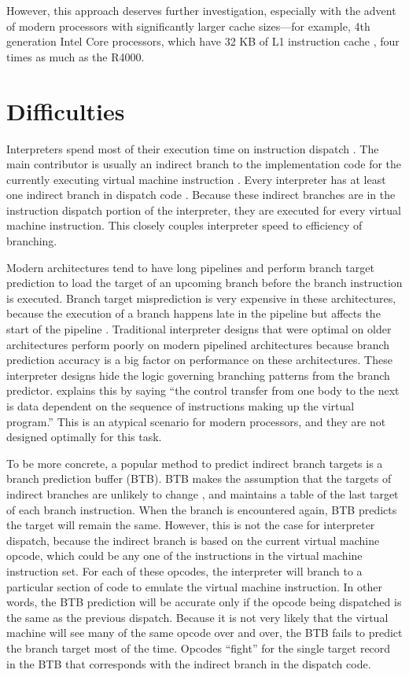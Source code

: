		However, this approach deserves further investigation, especially with the advent of modern processors with significantly larger cache sizes---for example, 4th generation Intel Core processors, which have 32 KB of L1 instruction cache \citep{haswellarch}, four times as much as the R4000.
	
		
	\section{Difficulties}
		Interpreters spend most of their execution time on instruction dispatch \citep{modernarchvm}. The main contributor is usually an indirect branch to the implementation code for the currently executing virtual machine instruction \citep{optimizingindirectbranch}. Every interpreter has at least one indirect branch in dispatch code \citep{modernarchvm}. Because these indirect branches are in the instruction dispatch portion of the interpreter, they are executed for every virtual machine instruction. This closely couples interpreter speed to efficiency of branching.
		
		Modern architectures tend to have long pipelines and perform branch target prediction to load the target of an upcoming branch before the branch instruction is executed. Branch target misprediction is very expensive in these architectures, because the execution of a branch happens late in the pipeline but affects the start of the pipeline \citep{optimizingindirectbranch}. Traditional interpreter designs that were optimal on older architectures perform poorly on modern pipelined architectures because branch prediction accuracy is a big factor on performance on these architectures. These interpreter designs hide the logic governing branching patterns from the branch predictor. \cite{yeti} explains this by saying ``the control transfer from one body to the next is data dependent on the sequence of instructions making up the virtual program.'' This is an atypical scenario for modern processors, and they are not designed optimally for this task.
		
		To be more concrete, a popular method to predict indirect branch targets is a branch prediction buffer (BTB). BTB makes the assumption that the targets of indirect branches are unlikely to change \citep{yeti}, and maintains a table of the last target of each branch instruction. When the branch is encountered again, BTB predicts the target will remain the same. However, this is not the case for interpreter dispatch, because the indirect branch is based on the current virtual machine opcode, which could be any one of the instructions in the virtual machine instruction set. For each of these opcodes, the interpreter will branch to a particular section of code to emulate the virtual machine instruction. In other words, the BTB prediction will be accurate only if the opcode being dispatched is the same as the previous dispatch. Because it is not very likely that the virtual machine will see many of the same opcode over and over, the BTB fails to predict the branch target most of the time. Opcodes ``fight'' for the single target record in the BTB that corresponds with the indirect branch in the dispatch code.
		
